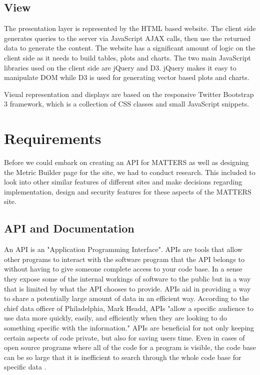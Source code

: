 		\subsection{View}
			
			The presentation layer is represented by the HTML based website. The client side generates 
			queries to the server via JavaScript AJAX calls, then use the returned data to generate the content.
			The website has a significant amount of logic on the client side as it needs to build 
			tables, plots and charts. The two main JavaScript libraries used on the client side are jQuery and D3.
			jQuery makes it easy to manipulate DOM while D3 is used for generating vector based plots and charts.
			
			Visual representation and displays are based on the responsive Twitter Bootstrap 3 framework, 
			which is a collection of CSS classes and small JavaScript snippets. 

	\section{Requirements}

		Before we could embark on creating an API for MATTERS as well as designing the Metric 
		Builder page for the site, we had to conduct research. This included to look into other 
		similar features of different sites and make decisions regarding implementation,
		design and security features for these aspects of the MATTERS site.

	\subsection{API and Documentation}

		An API is an "Application Programming Interface". APIs are tools that allow other 
		programs to interact with the software program that the API belongs to without 
		having to give someone complete access to your code base. In a sense they expose 
		some of the internal workings of software to the public but in a way that is 
		limited by what the API chooses to provide. APIs aid in providing a way to share 
		a potentially large amount of data in an efficient way. According to the chief 
		data officer of Philadelphia, Mark Headd, APIs "allow a specific audience to use 
		data more quickly, easily, and efficiently when they are looking to do something 
		specific with the information." APIs are beneficial for not only keeping certain 
		aspects of code private, but also for saving users time. Even in cases of open 
		source programs where all of the code for a program is visible, the
		code base can be so large that it is inefficient to search through the whole code base 
		for specific data \cite{govapi}. 

